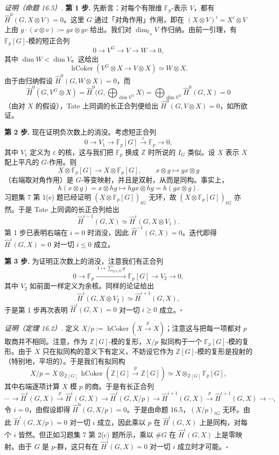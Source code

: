 \textit{证明（命题 16.5）.} \textbf{第 1 步.} 先断言：对每个有限维 $\mathbb F_p$-表示 $V$，都有 $\widehat H^0(G,X\otimes V)=0$。这里 $G$ 通过「对角作用」作用，即在 $(X\otimes V)^i=X^i\otimes V$ 上由 $g\cdot(x\otimes v):=gx\otimes gv$ 给出。我们对 $\dim_{\mathbb F_p}V$ 作归纳。由前一引理，有 $\mathbb F_p[G]$-模的短正合列
\[
0\to V^G\to V\to W\to 0,
\]
其中 $\dim W<\dim V$。这给出
\[
\operatorname{hCoker}(V^G\otimes X\to V\otimes X)\simeq W\otimes X.
\]
由于由归纳假设 $\widehat H^0(G,W\otimes X)=0$，而
\[
\widehat H^0(G,V^G\otimes X)=\widehat H^0\Big(G,\bigoplus_{\dim V^G}X\Big)=\bigoplus_{\dim V^G}\widehat H^0(G,X)=0
\]
（由对 $X$ 的假设），Tate 上同调的长正合列便给出 $\widehat H^0(G,V\otimes X)=0$，如所欲证。

\textbf{第 2 步.} 现在证明负次数上的消没。考虑短正合列
\[
0\to V_1\to \mathbb F_p[G]\xrightarrow{\ \varepsilon\ }\mathbb F_p\to 0,
\]
其中 $V_1$ 定义为 $\varepsilon$ 的核，这与我们把 $\mathbb F_p$ 换成 $\mathbb Z$ 时所说的 $I_G$ 类似。设 $\underline X$ 表示 $X$ 配上平凡的 $G$-作用。则
\[
\underline X\otimes\mathbb F_p[G]\to X\otimes\mathbb F_p[G],\qquad x\otimes g\mapsto gx\otimes g
\]
（右端取对角作用）是 $G$-等变映射，并且是双射，从而是同构。事实上，
\[
h(x\otimes g)=x\otimes hg\mapsto hgx\otimes hg=h(gx\otimes g).
\]
习题集 7 第 1(e) 题已经证明 $(\underline X\otimes\mathbb F_p[G])_{tG}$ 无环，故 $(X\otimes\mathbb F_p[G])_{tG}$ 亦然。于是 Tate 上同调的长正合列给出
\[
\widehat H^{i-1}(G,X)\simeq \widehat H^i(G,X\otimes V_1).
\]
第 1 步已表明右端在 $i=0$ 时消没，因此 $\widehat H^{-1}(G,X)=0$。迭代即得 $\widehat H^i(G,X)=0$ 对一切 $i\le 0$ 成立。

\textbf{第 3 步.} 为证明正次数上的消没，注意我们有正合列
\[
0\to \mathbb F_p\xrightarrow{\ 1\mapsto\sum_{g\in G}g\ }\mathbb F_p[G]\to V_2\to 0,
\]
其中 $V_2$ 如前面一样定义为余核。同样的论证给出
\[
\widehat H^i(G,X\otimes V_2)\simeq \widehat H^{i+1}(G,X),
\]
于是第 1 步再次表明 $\widehat H^i(G,X)=0$ 对一切 $i\ge 0$ 成立。\hfill$\square$

\textit{证明（定理 16.2）.} 定义 $X/p:=\operatorname{hCoker}(X\xrightarrow{p}X)$；注意这与把每一项都对 $p$ 取商并不相同。注意，作为 $\mathbb Z[G]$-模的复形，$X/p$ 拟同构于一个 $\mathbb F_p[G]$-模的复形。由于 $X$ 只在拟同构的意义下有定义，不妨设它作为 $\mathbb Z[G]$-模的复形是投射的（特别地，平坦的）。于是我们有拟同构
\[
X/p=X\otimes_{\mathbb Z[G]}\operatorname{hCoker}(\mathbb Z[G]\xrightarrow{p}\mathbb Z[G])\simeq X\otimes_{\mathbb Z[G]}\mathbb F_p[G],
\]
其中右端逐项计算 $X$ 模 $p$ 的商。于是有长正合列
\[
\cdots\to \widehat H^i(G,X)\xrightarrow{p}\widehat H^i(G,X)\to \widehat H^i(G,X/p)\to \widehat H^{i+1}(G,X)\xrightarrow{p}\widehat H^{i+1}(G,X)\to\cdots,
\]
令 $i=0$，由假设即得 $\widehat H^0(G,X/p)=0$。于是由命题 16.5，$(X/p)_{tG}$ 无环。由此 $\widehat H^i(G,X/p)=0$ 对一切 $i$ 成立，因此乘以 $p$ 在 $\widehat H^i(G,X)$ 上是同构，对每个 $i$ 皆然。但正如习题集 7 第 2(c) 题所示，乘以 $\#G$ 在 $\widehat H^i(G,X)$ 上是零映射。由于 $G$ 是 $p$-群，这只有在 $\widehat H^i(G,X)=0$ 对一切 $i$ 成立时才可能。\hfill$\square$

